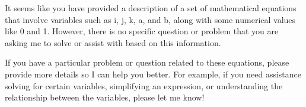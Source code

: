 It seems like you have provided a description of a set of mathematical equations that involve variables such as i, j, k, a, and b, along with some numerical values like 0 and 1. However, there is no specific question or problem that you are asking me to solve or assist with based on this information.

If you have a particular problem or question related to these equations, please provide more details so I can help you better. For example, if you need assistance solving for certain variables, simplifying an expression, or understanding the relationship between the variables, please let me know!